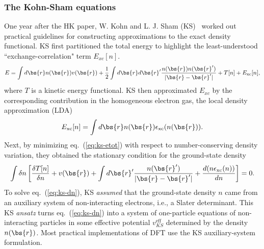 \subsubsection{The Kohn-Sham equations}

One year after the HK paper, W. Kohn and L. J. Sham (KS)~\cite{Kohn1965} worked out practical guidelines for constructing approximations to the exact density functional. KS first partitioned the total energy to highlight the least-understood ``exchange-correlation" term $E_{xc}[n]$.
\begin{align} \label{eq:ks-etot}
E=\int d\bs{r} n(\bs{r}) v(\bs{r}) + \frac{1}{2}\int d\bs{r}d\bs{r}' \dfrac{n(\bs{r})n(\bs{r}')}{\vert\bs{r}-\bs{r}'\vert} + T[n] + E_{\text{xc}}[n],
\end{align}
where $T$ is a kinetic energy functional. KS then approximated $E_{xc}$ by the corresponding contribution in the homogeneous electron gas, the local density approximation (LDA)
\begin{align}
E_{\text{xc}}[n] = \int d\bs{r}n(\bs{r})\epsilon_{\text{xc}}(n(\bs{r})).
\end{align}
Next, by minimizing eq.~(\ref{eq:ks-etot}) with respect to number-conserving density variation, they obtained the stationary condition for the ground-state density
\begin{align}
\int \delta n \left[
\dfrac{\delta T[n]}{\delta n}+
v(\bs{r}) + \int d\bs{r}' \dfrac{n(\bs{r}')}{\vert\bs{r}-\bs{r}'\vert}+
\dfrac{d(n\epsilon_{\text{xc}}(n))}{dn}
\right] = 0. \label{eq:ks-dn}
\end{align}
To solve eq.~(\ref{eq:ks-dn}), KS \textit{assumed} that the ground-state density $n$ came from an auxiliary system of non-interacting electrons, i.e., a Slater determinant. This KS \textit{ansatz} turns eq.~(\ref{eq:ks-dn}) into a system of one-particle equations of non-interacting particles in some effective potential $v^{\text{eff}}_{KS}$ determined by the density $n(\bs{r})$. Most practical implementations of DFT use the KS auxiliary-system formulation.

